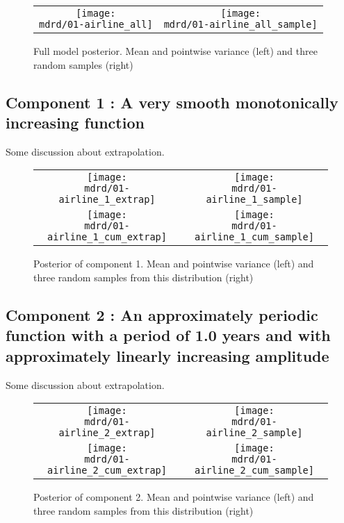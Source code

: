 \documentclass{article} %
\begin{document}
\begin{figure}[H]
\newcommand{\wmgd}{0.5\columnwidth}
\newcommand{\hmgd}{3.0cm}
\newcommand{\mdrd}{figures/01-airline}
\newcommand{\mbm}{\hspace{-0.3cm}}
\begin{tabular}{cc}
\mbm \texttt{[image: \\mdrd/01-airline\_all]} & \texttt{[image: \\mdrd/01-airline\_all\_sample]}
\end{tabular}
\caption{Full model posterior. Mean and pointwise variance (left) and three random samples (right)}
\label{fig:extrap}
\end{figure}

\subsection{Component 1 : A very smooth monotonically increasing function}

Some discussion about extrapolation.

\begin{figure}[H]
\newcommand{\wmgd}{0.5\columnwidth}
\newcommand{\hmgd}{3.0cm}
\newcommand{\mdrd}{figures/01-airline}
\newcommand{\mbm}{\hspace{-0.3cm}}
\begin{tabular}{cc}
\mbm \texttt{[image: \\mdrd/01-airline\_1\_extrap]} & \texttt{[image: \\mdrd/01-airline\_1\_sample]} \\
\mbm \texttt{[image: \\mdrd/01-airline\_1\_cum\_extrap]} & \texttt{[image: \\mdrd/01-airline\_1\_cum\_sample]}
\end{tabular}
\caption{Posterior of component 1. Mean and pointwise variance (left) and three random samples from this distribution (right)}
\label{fig:extrap1}
\end{figure}

\subsection{Component 2 : An approximately periodic function with a period of 1.0 years and with approximately linearly increasing amplitude}

Some discussion about extrapolation.

\begin{figure}[H]
\newcommand{\wmgd}{0.5\columnwidth}
\newcommand{\hmgd}{3.0cm}
\newcommand{\mdrd}{figures/01-airline}
\newcommand{\mbm}{\hspace{-0.3cm}}
\begin{tabular}{cc}
\mbm \texttt{[image: \\mdrd/01-airline\_2\_extrap]} & \texttt{[image: \\mdrd/01-airline\_2\_sample]} \\
\mbm \texttt{[image: \\mdrd/01-airline\_2\_cum\_extrap]} & \texttt{[image: \\mdrd/01-airline\_2\_cum\_sample]}
\end{tabular}
\caption{Posterior of component 2. Mean and pointwise variance (left) and three random samples from this distribution (right)}
\label{fig:extrap2}
\end{figure}
\end{document}
